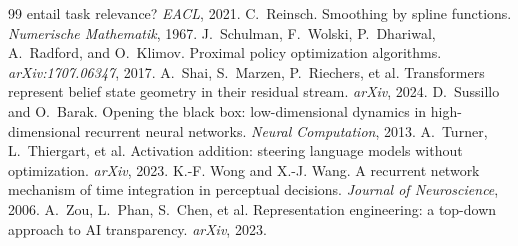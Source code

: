 \documentclass[11pt]{article}
\begin{document}
\begin{thebibliography}{99}
entail task relevance? \emph{EACL}, 2021.
 C.~Reinsch. Smoothing by spline
functions. \emph{Numerische Mathematik}, 1967.
 J.~Schulman, F.~Wolski,
P.~Dhariwal, A.~Radford, and O.~Klimov. Proximal policy optimization algorithms.
\emph{arXiv:1707.06347}, 2017.
 A.~Shai, S.~Marzen,
P.~Riechers, et al. Transformers represent belief state geometry in their
residual stream. \emph{arXiv}, 2024.
 D.~Sussillo and O.~Barak.
Opening the black box: low-dimensional dynamics in high-dimensional recurrent
neural networks. \emph{Neural Computation}, 2013.
 A.~Turner, L.~Thiergart,
et al. Activation addition: steering language models without optimization.
\emph{arXiv}, 2023.
 K.-F. Wong and X.-J. Wang. A
recurrent network mechanism of time integration in perceptual decisions.
\emph{Journal of Neuroscience}, 2006.
 A.~Zou, L.~Phan, S.~Chen, et al.
Representation engineering: a top-down approach to AI transparency. \emph{arXiv},
2023.
\end{thebibliography}
\end{document}
